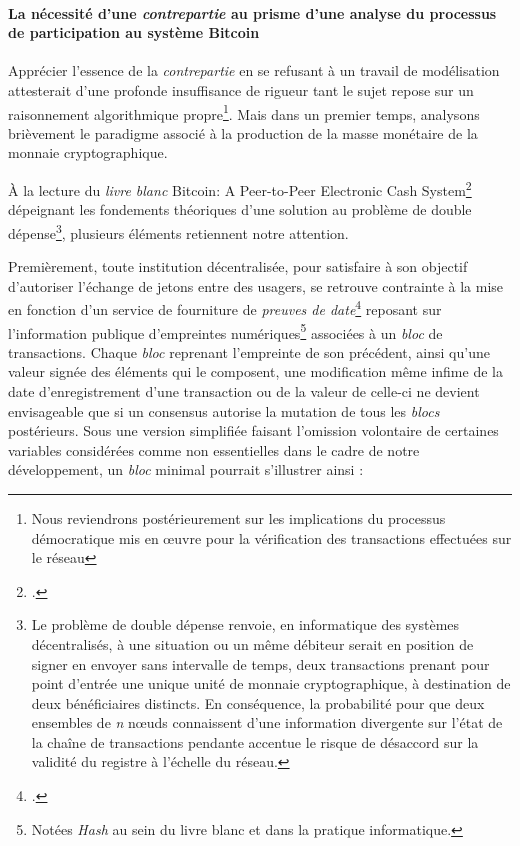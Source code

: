 {\paragraph{La nécessité d'une \emph{contrepartie} au prisme d'une analyse du processus de participation au système Bitcoin}

Apprécier l'essence de la \emph{contrepartie} en se refusant à un travail de modélisation attesterait d'une profonde insuffisance de rigueur tant le sujet repose sur un raisonnement algorithmique propre\footnote{Nous reviendrons postérieurement sur les implications du processus démocratique mis en \oe{}uvre pour la vérification des transactions effectuées sur le réseau}. Mais dans un premier temps, analysons brièvement le paradigme associé à la production de la masse monétaire de la monnaie cryptographique.\par
À la lecture du \emph{livre blanc} \og Bitcoin: A Peer-to-Peer Electronic Cash System\fg{}\footnote{.} dépeignant les fondements théoriques d'une solution au problème de \gls{double dépense}\footnote{Le problème de double dépense renvoie, en informatique des systèmes décentralisés, à une situation ou un même débiteur serait en position de signer en envoyer sans intervalle de temps, deux transactions prenant pour point d'entrée une unique unité de monnaie cryptographique, à destination de deux bénéficiaires distincts. En conséquence, la probabilité pour que deux ensembles de \emph{n} n\oe{}uds connaissent d'une information divergente sur l'état de la chaîne de transactions pendante accentue le risque de désaccord sur la validité du registre à l'échelle du réseau.}, plusieurs éléments retiennent notre attention.\par
Premièrement, toute institution décentralisée, pour satisfaire à son objectif d'autoriser l'échange de jetons entre des usagers, se retrouve contrainte à la mise en fonction d'un service de fourniture de \emph{preuves de date}\footnote{.} reposant sur l'information publique d'empreintes numériques\footnote{Notées \emph{Hash} au sein du livre blanc et dans la pratique informatique.} associées à un \emph{bloc} de transactions. Chaque \emph{bloc} reprenant l'empreinte de son précédent, ainsi qu'une valeur signée des éléments qui le composent, une modification même infime de la date d'enregistrement d'une transaction ou de la valeur de celle-ci ne devient envisageable que si un consensus autorise la mutation de tous les \emph{blocs} postérieurs. Sous une version simplifiée faisant l'omission volontaire de certaines variables considérées comme non essentielles dans le cadre de notre développement, un \emph{bloc} minimal pourrait s'illustrer ainsi :

}
